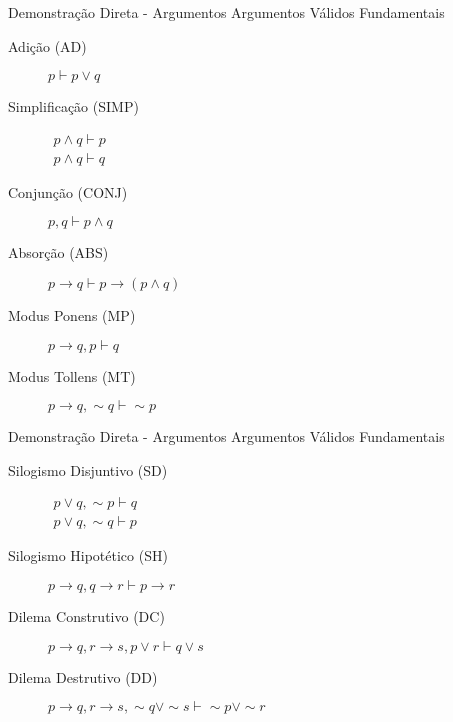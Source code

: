 \begin{frame}[t]{Demonstração Direta - Argumentos}
	Argumentos Válidos Fundamentais

	\begin{description}
	\item [Adição (AD)] $p \vdash p \vee q$
	
	\item [Simplificação (SIMP)] $\begin{array}{l}p \wedge q \vdash p\\p \wedge q \vdash q\end{array}$ 
	
	\item [Conjunção (CONJ)] $p, q \vdash p \wedge q$

	\item [Absorção (ABS)] $p \rightarrow q \vdash p \rightarrow(p \wedge q)$

	\item [Modus Ponens (MP)] $p \rightarrow q, p \vdash q$
	
	\item [Modus Tollens (MT)] $p \rightarrow q, \sim q \vdash \sim p$
	\end{description}
\end{frame}


\begin{frame}[t]{Demonstração Direta - Argumentos}
	Argumentos Válidos Fundamentais

	\begin{description}
	\item [Silogismo Disjuntivo (SD)] $\begin{array}{l}p \vee q, \sim p \vdash q\\p \vee q, \sim q \vdash p\end{array}$ 
	
	\item [Silogismo Hipotético (SH)] $p \rightarrow q, q \rightarrow r \vdash p \rightarrow r$ 

	\item [Dilema Construtivo (DC)] $p \rightarrow q, r \rightarrow s, p \vee r \vdash q \vee s$
	
	\item [Dilema Destrutivo (DD)] $p \rightarrow q, r \rightarrow s, \sim q \vee \sim s \vdash \sim p \vee \sim r$	
	\end{description}	
\end{frame}


